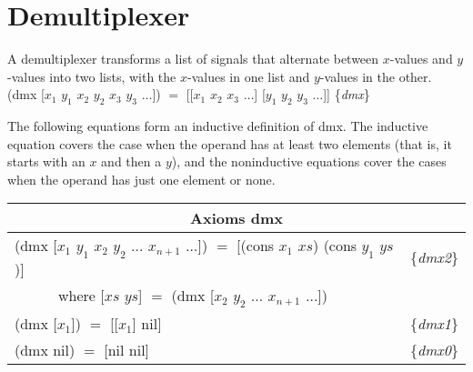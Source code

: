 \begin{exercises}


\end{exercises}

\section{Demultiplexer}
\label{sec:dmx}

A demultiplexer transforms a list of signals that alternate between
$x$-values and $y$-values into two lists,
with the $x$-values in one list and $y$-values in the other.\\
\hspace*{1cm} \textsf{(dmx [$x_1$ $y_1$ $x_2$ $y_2$ $x_3$ $y_3$ $\dots$]) $=$
[[$x_1$ $x_2$ $x_3$ $\dots$] [$y_1$ $y_2$ $y_3$ $\dots$]]}
\hfill \{\emph{dmx}\}

The following equations form an inductive definition of \textsf{dmx}.
The inductive equation covers the case when
the operand has at least two elements
(that is, it starts with an $x$ and then a $y$),
and the noninductive equations cover the cases
when the operand has just one element or none.

\begin{center}
\begin{tabular}{ll}
\multicolumn{2}{c}{Axioms \textsf{dmx}}\\
\hline
\textsf{(dmx [$x_1$ $y_1$ $x_2$ $y_2$ $\dots$ $x_{n+1}$ $\dots$])} $=$ \textsf{[(cons $x_1$ $xs$) (cons $y_1$ $ys$)] }&\{\emph{dmx2}\} \\
~~~~~~where \textsf{[$xs$ $ys$]} $=$ \textsf{(dmx [$x_2$ $y_2$ $\dots$ $x_{n+1}$ $\dots$])}       &\\
\textsf{(dmx [$x_1$]) $=$  [[$x_1$] nil]}                                                         &\{\emph{dmx1}\} \\
\textsf{(dmx nil) $=$ [nil nil] }                                                                 &\{\emph{dmx0}\} \\
\end{tabular}
\end{center}

